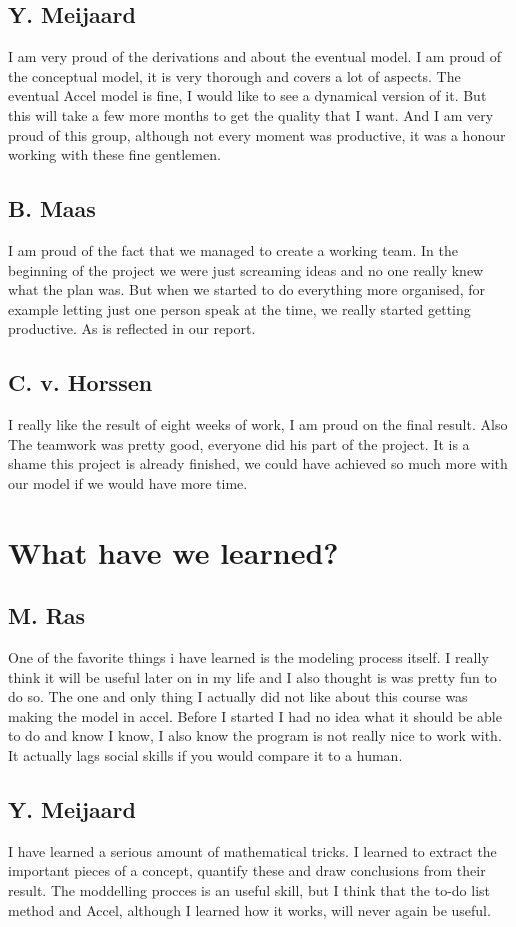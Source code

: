 \documentclass[a4paper, 11pt, notitlepage]{report}
\begin{document}
	\section{Y. Meijaard} I am very proud of the derivations and about the eventual model. I am proud of the conceptual model, it is very thorough and covers a lot of aspects. The eventual Accel model is fine, I would like to see a dynamical version of it. But this will take a few more months to get the quality that I want. And I am very proud of this group, although not every moment was productive, it was a honour working with these fine gentlemen.
	
	\section{B. Maas} I am proud of the fact that we managed to create a working team. In the beginning of the project we were just screaming ideas and no one really knew what the plan was. But when we started to do everything more organised, for example letting just one person speak at the time, we really started getting productive. As is reflected in our report.

\section{C. v. Horssen} I really like the result of eight weeks of work, I am proud on the final result. Also The teamwork was pretty good, everyone did his part of the project. It is a shame this project is already finished, we could have achieved so much more with our model if we would have more time.
\chapter{What have we learned?}
	\section{M. Ras}
	One of the favorite things i have learned is the modeling process itself. I really think it will be useful later on in my life and I also thought is was pretty fun to do so. The one and only thing I actually did not like about this course was making the model in accel. Before I started I had no idea what it should be able to do and know I know, I also know the program is not really nice to work with. It actually lags social skills if you would compare it to a human.
	
	\section{Y. Meijaard}
	I have learned a serious amount of mathematical tricks. I learned to extract the important pieces of a concept, quantify these and draw conclusions from their result. The moddelling procces is an useful skill, but I think that the to-do list method and Accel, although I learned how it works, will never again be useful.
	
\end{document}
